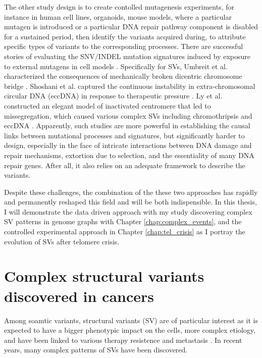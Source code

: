 \documentclass[phd,tocprelim]{cornell}
\begin{document}
The other study design is to create contolled mutagenesis experiments, for instance in human cell lines, organoids, mouse models, where a particular mutagen is introduced or a particular DNA repair pathway component is disabled for a sustained period, then identify the variants acquired during, to attribute specific types of variants to the corresponding processes. There are successful stories of evaluating the SNV/INDEL mutation signatures induced by exposure to external mutagens in cell models \cite{Zou2021-je}. Specifically for SVs, Umbreit et al. characterized the consequences of mechanically broken dicentric chromosome bridge \cite{Umbreit2020-kr}. Shoshani et al. captured the continuous instability in extra-chromosomal circular DNA (eccDNA) in response to therapeutic pressure \cite{Shoshani2020-zj}. Ly et al. constructed an elegant model of inactivated centromere that led to missegregation, which caused various complex SVs including chromothripsis and eccDNA \cite{Ly2019-bt}. Apparently, such studies are more powerful in establishing the causal links between mutational processes and signatures, but significantly harder to design, especially in the face of intricate interactions between DNA damage and repair mechanisms, extortion due to selection, and the essentiality of many DNA repair genes. After all, it also relies on an adequate framework to describe the variants.

Despite these challenges, the combination of the these two approaches has rapidly and permanently reshaped this field and will be both indispensible. In this thesis, I will demonstrate the data driven approach with my study discovering complex SV patterns in genome graphs with Chapter \ref*{chap:complex_events}, and the controlled experimental approach in Chapter \ref*{chap:tel_crisis} as I portray the evolution of SVs after telomere crisis.

\section{Complex structural variants discovered in cancers}
Among soamtic variants, structural variants (SV) are of particular interest as it is expected to have a bigger phenotypic impact on the cells, more complex etiology, and have been linked to various therapy resistence and metastasis \cite{Wedge2018-nf,Priestley:20196a6}. In recent years, many complex patterns of SVs have been discovered.
\end{document}

